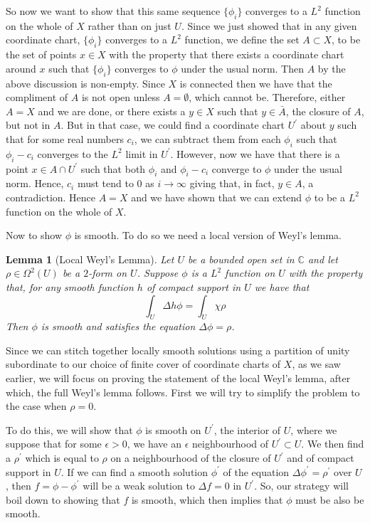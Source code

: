 \documentclass[11pt]{report}
\newtheorem{lemma}[thm]{Lemma}
\theoremstyle{definition}
\begin{document}
So now we want to show that this same sequence $\{\phi_i\}$ converges to a $L^2$ function on the whole of $X$ rather than on just $U$. Since we just showed that in any given coordinate chart, $\{\phi_i\}$ converges to a $L^2$ function, we define the set $A \subset X$, to be the set of points $x \in X$ with the property that there exists a coordinate chart around $x$ such that $\{\phi_i\}$ converges to $\phi$ under the usual norm. Then $A$ by the above discussion is non-empty. Since $X$ is connected then we have that the compliment of $A$ is not open unless $A=\emptyset$, which cannot be. Therefore, either $A=X$ and we are done, or there exists a $y \in X$ such that $y \in \bar{A}$, the closure of $A$, but not in $A$. But in that case, we could find a coordinate chart $U^{\prime}$ about $y$ such that for some real numbers $c_i$, we can subtract them from each $\phi_i$ such that $\phi_i - c_i$ converges to the $L^2$ limit in $U^{\prime}$. However, now we have that there is a point $x \in A \cap U^{\prime}$ such that both $\phi_i$ and $\phi_i - c_i$ converge to $\phi$ under the usual norm. Hence, $c_i$ must tend to $0$ as $i \rightarrow \infty$ giving that, in fact, $y \in A$, a contradiction. Hence $A=X$ and we have shown that we can extend $\phi$ to be a $L^2$ function on the whole of $X$. 

Now to show $\phi$ is smooth. To do so we need a local version of Weyl's lemma.
\begin{lemma}[Local Weyl's Lemma]\label{WeylsLemmaLocal}
  Let $U$ be a bounded open set in $\mathbb{C}$ and let $\rho \in \Omega^2(U)$ be a $2$-form on $U$. Suppose $\phi$ is a $L^2$ function on $U$ with the property that, for any smooth function $h$ of compact support in $U$ we have that 
  \[\int_U \Delta h\phi = \int_U \chi\rho\]
  Then $\phi$ is smooth and satisfies the equation $\Delta \phi = \rho$.
\end{lemma}

Since we can stitch together locally smooth solutions using a partition of unity subordinate to our choice of finite cover of coordinate charts of $X$, as we saw earlier, we will focus on proving the statement of the local Weyl's lemma, after which, the full Weyl's lemma follows. First we will try to simplify the problem to the case when $\rho = 0$. 

To do this, we will show that $\phi$ is smooth on $U^{\prime}$, the interior of $U$, where we suppose that for some $\epsilon > 0$, we have an $\epsilon$ neighbourhood of $U^{\prime}\subset U$. We then find a $\rho^{\prime}$ which is equal to $\rho$ on a neighbourhood of the closure of $U^{\prime}$ and of compact support in $U$. If we can find a smooth solution $\phi^{\prime}$ of the equation $\Delta \phi^{\prime} = \rho^{\prime}$ over $U$, then $f = \phi - \phi^{\prime}$ will be a weak solution to $\Delta f = 0 $ in $U^{\prime}$. So, our strategy will boil down to showing that $f$ is smooth, which then implies that $\phi$ must be also be smooth.
\end{document}
